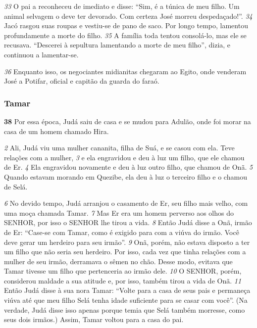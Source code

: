 \bigskip
\textit{\tiny 33}
O pai a reconheceu de imediato e disse: “Sim, é a túnica de meu filho. Um
animal selvagem o deve ter devorado. Com certeza José morreu despedaçado!”.
\textit{\tiny 34}
Jacó rasgou suas roupas e vestiu-se de pano de saco. Por longo tempo, lamentou
profundamente a morte do filho. 
\textit{\tiny 35}
A família toda tentou consolá-lo, mas ele se
recusava. “Descerei à sepultura
lamentando a morte de meu filho”, dizia, e
continuou a lamentar-se.
   
\bigskip
\textit{\tiny 36}
Enquanto isso, os negociantes midianitas
chegaram ao Egito, onde
venderam José a Potifar, oficial e capitão da guarda do faraó.


\bigskip
\subsubsection*{Tamar}
\textbf{\large 38}
   Por essa época, Judá saiu de casa e se mudou para Adulão, onde foi morar
na casa de um homem chamado Hira. 

\bigskip
\textit{\tiny 2} 
Ali, Judá viu uma mulher cananita, filha de
Suá, e se casou com ela. Teve relações com a mulher, 
\textit{\tiny 3} 
e ela engravidou e deu à luz
um filho, que ele chamou de Er. 
\textit{\tiny 4} 
Ela engravidou novamente e deu à luz outro
filho, que chamou de Onã. 
\textit{\tiny 5} 
Quando estavam morando em Quezibe, ela deu à luz
o terceiro filho e o chamou de Selá. 

\bigskip
\textit{\tiny 6} 
No   devido tempo, Judá arranjou o casamento de Er, seu filho mais velho, com
uma moça chamada Tamar. 
\textit{\tiny 7} 
Mas Er era um homem perverso aos olhos do
SENHOR, por isso o SENHOR lhe tirou a vida. 
\textit{\tiny 8} 
Então Judá disse a Onã, irmão de Er:
“Case-se com Tamar, como é exigido para com a viúva do irmão. Você deve gerar
um herdeiro para seu irmão”. 
\textit{\tiny 9} 
Onã, porém, não estava disposto a ter um filho que não seria seu herdeiro. Por
isso, cada vez que tinha relações com a mulher de seu irmão, derramava o sêmen
no chão. Desse modo, evitava que Tamar tivesse um filho que pertenceria ao
irmão dele. 
\textit{\tiny 10}
O SENHOR, porém, considerou maldade a sua atitude e, por isso,
também tirou a vida de Onã.
\textit{\tiny 11}
Então Judá disse à sua nora Tamar: “Volte para a casa de seus pais e
permaneça viúva até que meu filho Selá tenha idade suficiente para se casar com
você”. (Na verdade, Judá disse isso apenas porque temia que Selá também
morresse, como seus dois irmãos.) Assim, Tamar voltou para a casa do pai.

